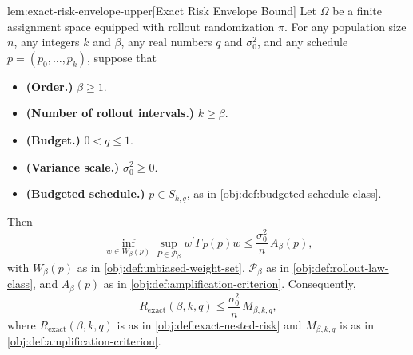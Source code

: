 \begin{lemmav}{lem:exact-risk-envelope-upper}[Exact Risk Envelope Bound]
Let $\Omega$ be a finite assignment space equipped with rollout randomization $\pi$. For any population size $n$, any integers $k$ and $\beta$, any real numbers $q$ and $\sigma_0^2$, and any schedule $p=(p_0,\ldots,p_k)$, suppose that
\begin{itemize}
\item \textbf{(Order.)} $\beta\ge 1$.
\item \textbf{(Number of rollout intervals.)} $k\ge \beta$.
\item \textbf{(Budget.)} $0<q\le 1$.
\item \textbf{(Variance scale.)} $\sigma_0^2\ge 0$.
\item \textbf{(Budgeted schedule.)} $p\in S_{k,q}$, as in \cref{obj:def:budgeted-schedule-class}.
\end{itemize}
Then
\[
\inf_{w\in W_\beta(p)}
\sup_{P\in\mathcal P_\beta}
w^\prime \Gamma_P(p) w
\le
\frac{\sigma_0^2}{n}\,A_\beta(p),
\]
with $W_\beta(p)$ as in \cref{obj:def:unbiased-weight-set}, $\mathcal P_\beta$ as in \cref{obj:def:rollout-law-class}, and $A_\beta(p)$ as in \cref{obj:def:amplification-criterion}. Consequently,
\[
R_{\mathrm{exact}}(\beta,k,q)
\le
\frac{\sigma_0^2}{n}\,M_{\beta,k,q},
\]
where $R_{\mathrm{exact}}(\beta,k,q)$ is as in \cref{obj:def:exact-nested-risk} and $M_{\beta,k,q}$ is as in \cref{obj:def:amplification-criterion}.
\end{lemmav}

